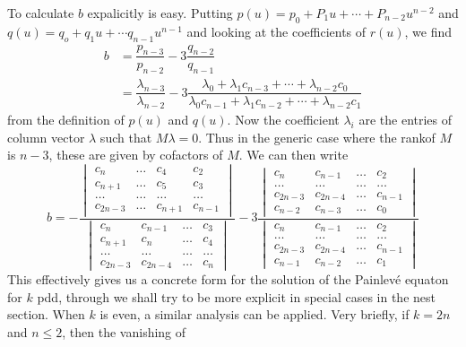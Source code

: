 To calculate $b$ expalicitly is easy. Putting $p(u) = p_{0}+P_{1}u+ \cdots+P_{n-2}u^{n-2}$
and $q(u) =q_{o} +q_{1}u +\cdots q_{n-1}u^{n-1}$ and looking at the coefficients of $r(u)$, we find
\begin{align*}
b &= \dfrac{p_{n-3}}{p_{n-2}}-3\dfrac{q_{n-2}}{q_{n-1}}\\
  &= \dfrac{\lambda_{n-3}}{\lambda_{n-2}}-3\dfrac{\lambda_{0}+\lambda_{1}c_{n-3}+ \cdots + \lambda_{n-2}c_{0}}{\lambda_{0}c_{n-1} + \lambda_{1}c_{n-2}+\cdots + \lambda_{n-2}c_{1}}
\end{align*}
from the definition of $p(u)$ and $q(u)$. Now the coefficient $\lambda_{i}$ are the entries of column vector $\lambda$ such that $M\lambda =0$. Thus in the generic case where the rank\pageoriginale of $M$ is $n-3$, these are given by cofactors of $M$. We can then write
\begin{equation*}\label{art7-eq-19}
b =
-\dfrac{\begin{vmatrix}
c_{n} & \ldots & c_{4} & c_{2}\\
c_{n+1}& \ldots & c_{5} & c_{3}\\
\ldots & \ldots & \ldots & \ldots\\
c_{2n-3} & \ldots & c_{n+1} & c_{n-1}
\end{vmatrix}}{\begin{vmatrix}
c_{n} & c_{n-1} & \ldots   & c_{3}\\
c_{n+1}& c_{n} &\ldots   & c_{4}\\
\ldots & \ldots & \ldots & \ldots\\
c_{2n-3} & c_{2n-4} & \ldots &  c_{n}
\end{vmatrix}}
-3
\dfrac{\begin{vmatrix}
c_{n} & c_{n-1} & \ldots   & c_{2}\\
\ldots & \ldots & \ldots & \ldots\\
c_{2n-3} & c_{2n-4} & \ldots &  c_{n-1}\\
c_{n-2} & c_{n-3} & \ldots &  c_{0}
\end{vmatrix}}{\begin{vmatrix}
c_{n} & c_{n-1} & \ldots   & c_{2}\\
\ldots & \ldots & \ldots & \ldots\\
c_{2n-3} & c_{2n-4} & \ldots &  c_{n-1}\\
c_{n-1} & c_{n-2} & \ldots &  c_{1}
\end{vmatrix}}\tag{19}
\end{equation*}
This effectively gives us a concrete form for the solution of the Painlev\'e equaton for $k$ pdd, through we shall try to be more explicit in special cases in the nest section. When $k$ is even, a similar analysis can be applied. Very briefly, if $k=2n$ and $n\leq 2$, then the vanishing of
